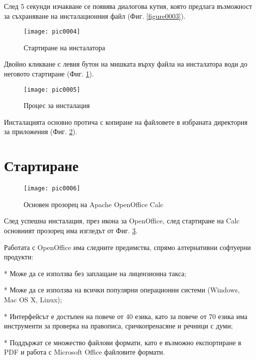 След 5 секунди изчакване се появява диалогова кутия, която предлага възможност за съхраняване на инсталационния файл (Фиг. \ref{figure0003}).

\begin{figure}[h!]
  \centering
  \texttt{[image: pic0004]}
  \caption{Стартиране на инсталатора}
\label{figure0004}
\end{figure}
\FloatBarrier

Двойно кликване с левия бутон на мишката върху файла на инсталатора води до неговото стартиране (Фиг. \ref{figure0004}).

\begin{figure}[h!]
  \centering
  \texttt{[image: pic0005]}
  \caption{Процес за инсталация}
\label{figure0005}
\end{figure}
\FloatBarrier

Инсталацията основно протича с копиране на файловете в избраната директория за приложения (Фиг. \ref{figure0005}).

\section{Стартиране}

\begin{figure}[h!]
  \centering
  \texttt{[image: pic0006]}
  \caption{Основен прозорец на Apache OpenOffice Calc}
\label{figure0006}
\end{figure}
\FloatBarrier

След успешна инсталация, през икона за OpenOffice, след стартиране на Calc основният прозорец има изгледът от Фиг. \ref{figure0006}.

Работата с OpenOffice има следните предимства, спрямо алтернативни софтуерни продукти:

* Може да се използва без заплащане на лицензионна такса;

* Може да се използва на всички популярни операционни системи (Windows, Mac OS X, Linux); 

* Интерфейсът е достъпен на повече от 40 езика, като за повече от 70 езика има инструменти за проверка на правописа, сричкопренасяне и речници с думи;

* Поддържат се множество файлови формати, като е възможно експортиране в PDF и работа с Microsoft Office файловите формати. 


